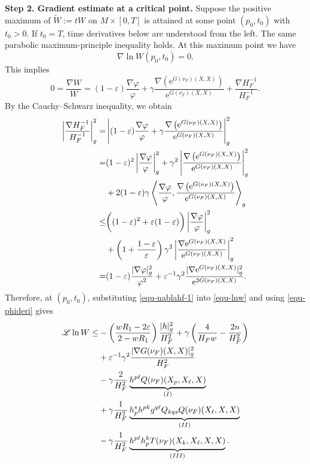\documentclass[10pt,a4paper]{amsart}
\numberwithin{equation}{section}
\begin{document}
		\textbf{Step 2. Gradient estimate at a critical point.}
		Suppose the positive maximum of $\tilde{W}:=tW$ on $M\times[0,T]$ is attained at some point $(p_0,t_0)$ with $t_0>0$. If $t_0=T$, time derivatives below are understood from the left. The same parabolic maximum-principle inequality holds. At this maximum point we have
		\begin{equation*}
			\nabla \ln W(p_0,t_0)=0.
		\end{equation*}
		This implies
		\begin{equation*}
			0 = \dfrac{\nabla W}{W} = (1-\varepsilon)\dfrac{\nabla\varphi}{\varphi} + \gamma \dfrac{\nabla\left( \mathrm{e}^{G(\nu_F)(X,X)} \right)}{\mathrm{e}^{G(\nu_F)(X,X)}} + \dfrac{\nabla H_F^{-1}}{H_F^{-1}}.
		\end{equation*}
		By the Cauchy--Schwarz inequality, we obtain
		\begin{align}
			\left|\dfrac{\nabla H_F^{-1}}{H_F^{-1}}\right|^2_{g} =& \left| (1-\varepsilon)\dfrac{\nabla\varphi}{\varphi} + \gamma\dfrac{\nabla\left( \mathrm{e}^{G(\nu_F)(X,X)} \right)}{\mathrm{e}^{G(\nu_F)(X,X)}} \right|_{g}^2 \notag\\
			=& (1-\varepsilon)^2\left| \dfrac{\nabla\varphi}{\varphi} \right|_{g}^2 + \gamma^2\left| \dfrac{\nabla\left( \mathrm{e}^{G(\nu_F)(X,X)} \right)}{\mathrm{e}^{G(\nu_F)(X,X)}} \right|^2_{g} \nonumber\\
			&+ 2(1-\varepsilon)\gamma\left\langle \dfrac{\nabla\varphi}{\varphi},\dfrac{\nabla\left( \mathrm{e}^{G(\nu_F)(X,X)} \right)}{\mathrm{e}^{G(\nu_F)(X,X)}}  \right\rangle_{g} \notag\\
			\leq& \bigg( (1-\varepsilon)^2+\varepsilon(1-\varepsilon) \bigg)\left| \dfrac{\nabla\varphi}{\varphi} \right|_{g}^2 \notag\\
			&+ \left(1+\dfrac{1-\varepsilon}{\varepsilon}\right)\gamma^2\left| \dfrac{\nabla\mathrm{e}^{G(\nu_F)(X,X)}}{\mathrm{e}^{G(\nu_F)(X,X)}} \right|_{g}^2 \notag\\
			=& (1-\varepsilon)  \dfrac{|\nabla\varphi|_{g}^2}{\varphi^2} + \varepsilon^{-1}\gamma^2 \dfrac{|\nabla\mathrm{e}^{G(\nu_F)(X,X)}|_{g}^2}{\mathrm{e}^{2G(\nu_F)(X,X)}}.  \label{equ-nablahf-1}
		\end{align}
		Therefore, at $(p_0,t_0)$, substituting \eqref{equ-nablahf-1} into \eqref{equ-lnw} and using \eqref{equ-phideri} gives
		\begin{align}
			\mathscr{L} \ln W \leq& -\left( \dfrac{wR_1-2\varepsilon}{2-wR_1} \right)\dfrac{|h|_{g}^2}{H_F^2} +\gamma\left( \dfrac{4}{H_F w}-\dfrac{2n}{H_F^2} \right) \nonumber\\
			&+ \varepsilon^{-1}\gamma^2\dfrac{|\nabla G(\nu_F)(X,X)|_{g}^2}{H_F^2} \notag\\
			&- \gamma\dfrac{2}{H_F^2}\underbrace{h^{p\ell}Q(\nu_F)(X_p,X_{\ell},X)}_{(I)} \nonumber\\
			&+ \gamma\dfrac{1}{H_F^2}\underbrace{h^s_ph^{pk}g^{q\ell}Q_{kqs}Q(\nu_F)(X_{\ell},X,X)}_{(II)} \notag\\
			&- \gamma\dfrac{1}{H_F^2} \underbrace{h^{p\ell}h^k_p T(\nu_F)(X_k,X_{\ell},X,X)}_{(III)}.
			\label{12}
		\end{align}
		
\end{document}

